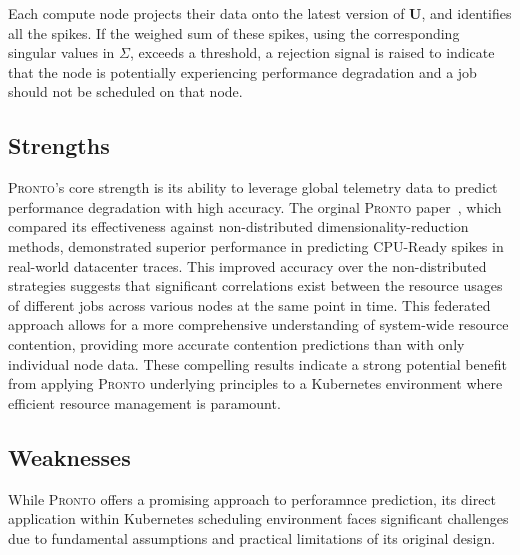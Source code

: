 Each compute node projects their data onto the latest version of $\textbf{U}$,
and identifies all the spikes. If the weighed sum of these spikes, using the
corresponding singular values in $\Sigma$, exceeds a threshold, a rejection
signal is raised to indicate that the node is potentially experiencing
performance degradation and a job should not be scheduled on that node.

\subsection{Strengths}
\textsc{Pronto}'s core strength is its ability to leverage global telemetry data
to predict performance degradation with high accuracy. The orginal
\textsc{Pronto} paper~\cite{grammenos_pronto_2021}, which compared its
effectiveness against non-distributed dimensionality-reduction methods,
demonstrated superior performance in predicting CPU-Ready spikes in real-world
datacenter traces. This improved accuracy over the non-distributed
strategies suggests that significant correlations exist between the resource
usages of different jobs across various nodes at the same point in time. This
federated approach allows for a more comprehensive understanding of system-wide
resource contention, providing more accurate contention predictions than with
only individual node data. These compelling results indicate a strong potential
benefit from applying \textsc{Pronto} underlying principles to a Kubernetes
environment where efficient resource management is paramount.

\subsection{Weaknesses}
While \textsc{Pronto} offers a promising approach to perforamnce prediction, its
direct application within Kubernetes scheduling environment faces significant
challenges due to fundamental assumptions and practical limitations of its
original design.

